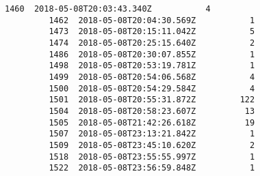 \documentclass[11pt]{article}
\begin{document}
\begin{Verbatim}[commandchars=\\\{\}]
         1460  2018-05-08T20:03:43.340Z           4   
         1462  2018-05-08T20:04:30.569Z           1   
         1473  2018-05-08T20:15:11.042Z           5   
         1474  2018-05-08T20:25:15.640Z           2   
         1486  2018-05-08T20:30:07.855Z           1   
         1498  2018-05-08T20:53:19.781Z           1   
         1499  2018-05-08T20:54:06.568Z           4   
         1500  2018-05-08T20:54:29.584Z           4   
         1501  2018-05-08T20:55:31.872Z         122   
         1504  2018-05-08T20:58:23.607Z          13   
         1505  2018-05-08T21:42:26.618Z          19   
         1507  2018-05-08T23:13:21.842Z           1   
         1509  2018-05-08T23:45:10.620Z           2   
         1518  2018-05-08T23:55:55.997Z           1   
         1522  2018-05-08T23:56:59.848Z           1   
         

\end{Verbatim}
\end{document}
